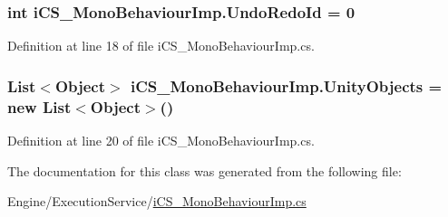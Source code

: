 \hypertarget{classi_c_s___mono_behaviour_imp_abd0c66db60261c37d9885aafbde5b6b2}{
\subsubsection[{Undo\+Redo\+Id}]{\setlength{\rightskip}{0pt plus 5cm}int i\+C\+S\+\_\+\+Mono\+Behaviour\+Imp.\+Undo\+Redo\+Id = 0}}\label{classi_c_s___mono_behaviour_imp_abd0c66db60261c37d9885aafbde5b6b2}


Definition at line 18 of file i\+C\+S\+\_\+\+Mono\+Behaviour\+Imp.\+cs.

\hypertarget{classi_c_s___mono_behaviour_imp_a4b094bafa016da5f142c93b588db58a9}{
\subsubsection[{Unity\+Objects}]{\setlength{\rightskip}{0pt plus 5cm}List$<${\bf Object}$>$ i\+C\+S\+\_\+\+Mono\+Behaviour\+Imp.\+Unity\+Objects = new List$<${\bf Object}$>$()}}\label{classi_c_s___mono_behaviour_imp_a4b094bafa016da5f142c93b588db58a9}


Definition at line 20 of file i\+C\+S\+\_\+\+Mono\+Behaviour\+Imp.\+cs.



The documentation for this class was generated from the following file\+:\begin{DoxyCompactItemize}
\item 
Engine/\+Execution\+Service/\hyperlink{i_c_s___mono_behaviour_imp_8cs}{i\+C\+S\+\_\+\+Mono\+Behaviour\+Imp.\+cs}\end{DoxyCompactItemize}
